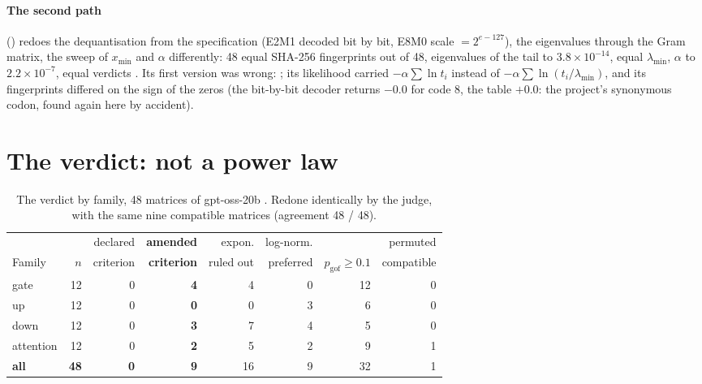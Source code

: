 \paragraph{The second path} () redoes the dequantisation from the specification (E2M1 decoded bit by bit, E8M0 scale $= 2^{e - 127}$), the eigenvalues through the Gram matrix, the sweep of $x_{\min}$ and $\alpha$ differently: 48 equal SHA-256 fingerprints out of 48, eigenvalues of the tail to $3.8 \times 10^{-14}$, equal $\lambda_{\min}$, $\alpha$ to $2.2 \times 10^{-7}$, equal verdicts \mes. Its first version was wrong: ; its likelihood carried $-\alpha\sum\ln t_i$ instead of $-\alpha\sum\ln(t_i/\lambda_{\min})$, and its fingerprints differed on the sign of the zeros (the bit-by-bit decoder returns $-0.0$ for code 8, the table $+0.0$: the project's synonymous codon, found again here by accident).

\section{The verdict: not a power law}\label{t3spe:sec:verdict}

\begin{table}[tbp]
\centering\small
\caption[The verdict by family]{The verdict by family, 48 matrices of gpt-oss-20b \mes. Redone identically by the judge, with the same nine compatible matrices (agreement 48 / 48).}
\label{t3spe:tab:verdict}
\setlength{\tabcolsep}{4pt}
\begin{tabular}{@{}lrrrrrrr@{}}
\toprule
& & declared & \textbf{amended} & expon. & log-norm. & & permuted \\
Family & $n$ & criterion & \textbf{criterion} & ruled out & preferred & $p_{\mathrm{gof}} \ge 0.1$ & compatible \\
\midrule
gate & 12 & 0 & \textbf{4} & 4 & 0 & 12 & 0 \\
up & 12 & 0 & \textbf{0} & 0 & 3 & 6 & 0 \\
down & 12 & 0 & \textbf{3} & 7 & 4 & 5 & 0 \\
attention & 12 & 0 & \textbf{2} & 5 & 2 & 9 & 1 \\
\midrule
\textbf{all} & \textbf{48} & \textbf{0} & \textbf{9} & 16 & 9 & 32 & 1 \\
\bottomrule
\end{tabular}
\end{table}

